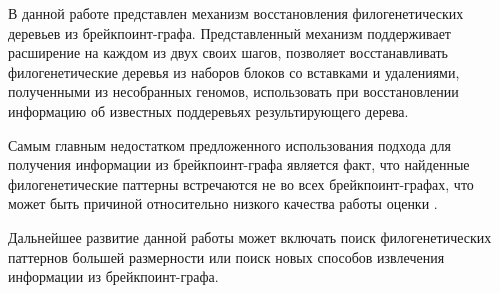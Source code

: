 \conclusion

В данной работе представлен механизм восстановления филогенетических деревьев из брейкпоинт-графа.
Представленный механизм поддерживает расширение на каждом из двух своих шагов,
позволяет восстанавливать филогенетические деревья из наборов блоков со вставками и удалениями,
полученными из несобранных геномов, использовать при восстановлении информацию об известных поддеревьях результирующего дерева.

Самым главным недостатком предложенного использования подхода для получения информации из брейкпоинт-графа является факт,
что найденные филогенетические паттерны встречаются не во всех брейкпоинт-графах, что может быть причиной относительно низкого качества работы
оценки .

Дальнейшее развитие данной работы может включать поиск филогенетических паттернов большей размерности или поиск новых способов
извлечения информации из брейкпоинт-графа.
